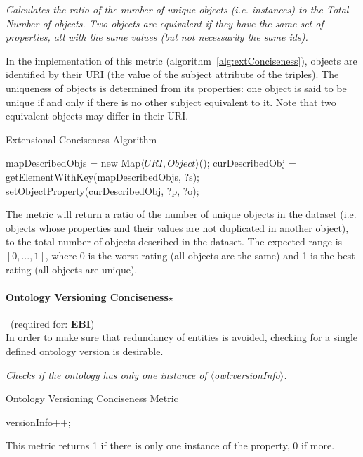 \begin{mdframed}[style=metricdefinition]
\emph{Calculates the ratio of the number of unique objects (i.e. instances) to the Total Number of objects. Two objects are equivalent if they have the same set of properties, all with the same values (but not necessarily the same ids).}
\end{mdframed}

In the implementation of this metric (algorithm~\ref{alg:extConciseness}), objects are identified by their URI (the value of the subject attribute of the triples). The uniqueness of objects is determined from its properties: one object is said to be unique if and only if there is no other subject equivalent to it. Note that two equivalent objects may differ in their URI.
\begin{algorithm}
\caption{Extensional Conciseness Algorithm} \label{alg:extConciseness}
\begin{algorithmic}[1]
\State mapDescribedObjs = new Map$\langle URI, Object\rangle$();
\EndProcedure
{}
\State curDescribedObj = getElementWithKey(mapDescribedObjs, ?s);
\State setObjectProperty(curDescribedObj, ?p, ?o); ~\\
\EndProcedure
\end{algorithmic}
\end{algorithm}
The metric will return a ratio of the number of unique objects in the dataset (i.e. objects whose properties and their values are not duplicated in another object), to the total number of objects described in the dataset. The expected range is $[0,\ldots,1]$, where 0 is the worst rating (all objects are the same) and 1 is the best rating (all objects are unique).

\paragraph{Ontology Versioning Conciseness$\star$}~(required for: \textbf{EBI})~\\
In order to make sure that redundancy of entities is avoided, checking for a single defined ontology version is desirable.

\begin{mdframed}[style=metricdefinition]
\emph{Checks if the ontology has only one instance of $\langle$owl:versionInfo$\rangle$.}
\end{mdframed}

\begin{algorithm}
\caption{Ontology Versioning Conciseness Metric}
\begin{algorithmic}[1]
 versionInfo++;   \EndIf 
\EndProcedure
\end{algorithmic}
\end{algorithm}

This metric returns 1 if there is only one instance of the property, 0 if more.

